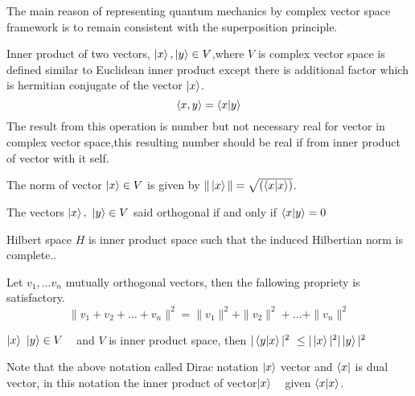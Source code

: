 The main reason of representing quantum mechanics by complex vector space framework is to remain consistent with the superposition principle.
\begin{defn}\label{Innerpro}

Inner product of two vectors, $\ket{x} ,\ket{y }\in V$,where $V$ is complex vector space is defined similar to Euclidean inner product except there is additional factor which is hermitian conjugate of the vector $\ket{x}$.
$$\left\langle x,y\right\rangle=\bra{x}\ket{y }$$
The result from this operation is number but not necessary real for vector in complex vector space,this resulting number should be real if from inner product of vector with it self.
\end{defn}
\begin{defn}

The norm of vector $\ket{x} \in V$ is given by $\| \ket{x}\|=\sqrt{\left(\bra{x}\ket{x}\right)}$.
\end{defn}

\begin{defn}[orthogonal]

The vectors $\ket{x},~ \ket{y} \in V$ said orthogonal if and only if $\bra{x}\ket{y}=0$
\end{defn}

\begin{defn}

Hilbert space $H$ is inner product space such that the induced Hilbertian norm is complete.\citep{book:4365}.
\end{defn}

\begin{defn}[Pythagoras]

Let $v_1,\dots v_n$ mutually orthogonal vectors, then the fallowing propriety is satisfactory.
$$\|v_1+v_2+\dots+v_n\|^2=\| v_1\|^2+\| v_2\|^2+\dots +\| v_n\|^2$$
\end{defn}

\begin{defn}\label{CSC}

$\ket{x} ~\ket{y} \in V $ ~ and $V$ is inner product space,
then $|\bra{y}\ket{x}|^2~\leq |\ket{x} |^2|\ket{y}|^2$
\end{defn}

Note that the above notation called Dirac notation $\ket{x}$ vector and $\bra{x}$ is dual vector, in this notation the inner product of vector$\ket{x}$ ~ given $\bra{x}\ket{x}$.

